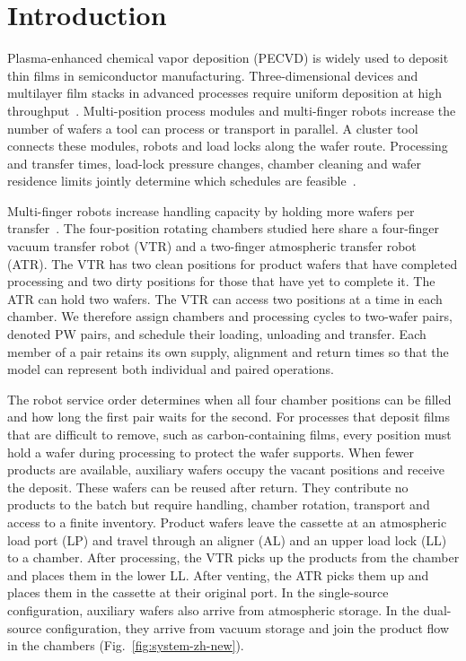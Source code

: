 \section{Introduction}

Plasma-enhanced chemical vapor deposition (PECVD) is widely used to deposit thin films in semiconductor manufacturing. Three-dimensional devices and multilayer film stacks in advanced processes require uniform deposition at high throughput~\citep{xia2016pecvd,kim2023onstack}. Multi-position process modules and multi-finger robots increase the number of wafers a tool can process or transport in parallel. A cluster tool connects these modules, robots and load locks along the wafer route. Processing and transfer times, load-lock pressure changes, chamber cleaning and wafer residence limits jointly determine which schedules are feasible~\citep{pan2018survey}.

Multi-finger robots increase handling capacity by holding more wafers per transfer~\citep{gu2024applied,gu2024multifinger}. The four-position rotating chambers studied here share a four-finger vacuum transfer robot (VTR) and a two-finger atmospheric transfer robot (ATR). The VTR has two clean positions for product wafers that have completed processing and two dirty positions for those that have yet to complete it. The ATR can hold two wafers. The VTR can access two positions at a time in each chamber. We therefore assign chambers and processing cycles to two-wafer pairs, denoted PW pairs, and schedule their loading, unloading and transfer. Each member of a pair retains its own supply, alignment and return times so that the model can represent both individual and paired operations.

The robot service order determines when all four chamber positions can be filled and how long the first pair waits for the second. For processes that deposit films that are difficult to remove, such as carbon-containing films, every position must hold a wafer during processing to protect the wafer supports. When fewer products are available, auxiliary wafers occupy the vacant positions and receive the deposit. These wafers can be reused after return. They contribute no products to the batch but require handling, chamber rotation, transport and access to a finite inventory. Product wafers leave the cassette at an atmospheric load port (LP) and travel through an aligner (AL) and an upper load lock (LL) to a chamber. After processing, the VTR picks up the products from the chamber and places them in the lower LL. After venting, the ATR picks them up and places them in the cassette at their original port. In the single-source configuration, auxiliary wafers also arrive from atmospheric storage. In the dual-source configuration, they arrive from vacuum storage and join the product flow in the chambers (Fig.~\ref{fig:system-zh-new}).

